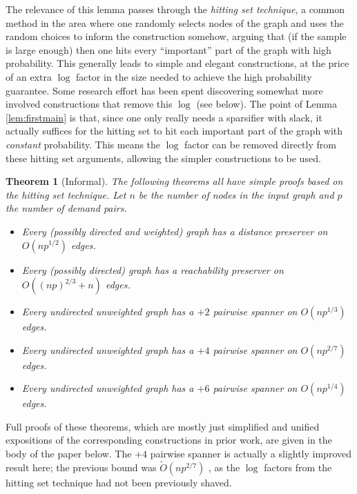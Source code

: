 \documentclass{article}
\newtheorem{theorem}{Theorem}
\newcommand{\Oish}{\widetilde{O}}
\begin{document}
The relevance of this lemma passes through the \emph{hitting set technique}, a common method in the area where one randomly selects nodes of the graph and uses the random choices to inform the construction somehow, arguing that (if the sample is large enough) then one hits every ``important'' part of the graph with high probability.
This generally leads to simple and elegant constructions, at the price of an extra $\log$ factor in the size needed to achieve the high probability guarantee.
Some research effort has been spent discovering somewhat more involved constructions that remove this $\log$ (see below).
The point of Lemma \ref{lem:firstmain} is that, since one only really needs a sparsifier with slack, it actually suffices for the hitting set to hit each important part of the graph with \emph{constant} probability.
This means the $\log$ factor can be removed directly from these hitting set arguments, allowing the simpler constructions to be used.

\begin{theorem} [Informal] \label{thm:sparsifiers}
The following theorems all have simple proofs based on the hitting set technique.
Let $n$ be the number of nodes in the input graph and $p$ the number of demand pairs.
\begin{itemize}
\item Every (possibly directed and weighted) graph has a distance preserver on $O(np^{1/2})$ edges. \cite{CE06}

\item Every (possibly directed) graph has a reachability preserver on $O((np)^{2/3} + n)$ edges. \cite{AB18}

\item Every undirected unweighted graph has a $+2$ pairwise spanner on $O(np^{1/3})$ edges. \cite{KV15, AB16soda, Knudsen14}

\item Every undirected unweighted graph has a $+4$ pairwise spanner on $O(np^{2/7})$ edges. \cite{Kavitha17}

\item Every undirected unweighted graph has a $+6$ pairwise spanner on $O(np^{1/4})$ edges. \cite{Kavitha17, Knudsen14}
\end{itemize}
\end{theorem}

Full proofs of these theorems, which are mostly just simplified and unified expositions of the corresponding constructions in prior work, are given in the body of the paper below.
The $+4$ pairwise spanner is actually a slightly improved result here; the previous bound was $\Oish(np^{2/7})$ \cite{Kavitha17}, as the $\log$ factors from the hitting set technique had not been previously shaved.
\end{document}
